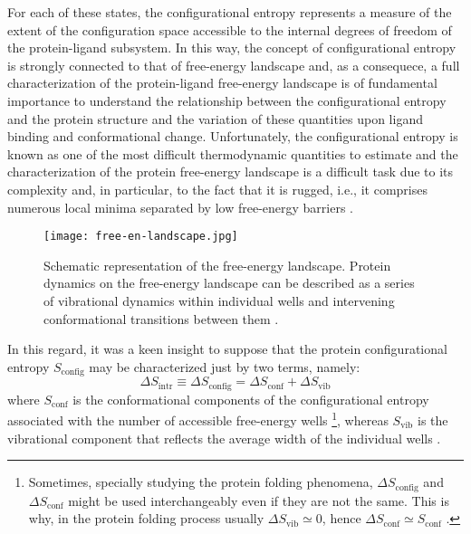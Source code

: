 For each of these states, the configurational entropy represents a measure of the extent of the configuration space accessible to the internal degrees of freedom of the protein-ligand subsystem. In this way, the concept of configurational entropy is strongly connected to that of free-energy landscape and, as a consequece, a full characterization of the protein-ligand free-energy landscape is of fundamental importance to understand the relationship between the configurational entropy and the protein structure and the variation of these quantities upon ligand binding and conformational change. Unfortunately, the configurational entropy is known as one of the most difficult thermodynamic quantities to estimate and the characterization of the protein free-energy landscape is a difficult task due to its complexity and, in particular, to the fact that it is rugged, i.e., it comprises numerous local minima separated by low free-energy barriers \cite{chong2015dissecting}. 

\begin{figure}[h]
\centering
\begin{minipage}[t]{0.8\textwidth}
\centering
\texttt{[image: free-en-landscape.jpg]}

\caption{\small{Schematic representation of the free-energy landscape. Protein dynamics on the free-energy landscape can be described as a series of vibrational dynamics within individual wells and intervening conformational transitions between them \cite{chong2015dissecting}.}}

\label{fig:generation-of-microcan_state}
\end{minipage} 
\end{figure}
In this regard, it was a keen insight to suppose that the protein configurational entropy $S_\text{config}$ may be characterized just by two terms, namely: 
\begin{equation*}
\label{entropy-variation:configurational}
\Delta S_\text{intr} \equiv \Delta S_\text{config} = \Delta S_\text{conf} + \Delta S_\text{vib}
\end{equation*}
where  $S_\text{conf}$ is the conformational components of the configurational entropy associated with the number of accessible free-energy wells \footnote{Sometimes, specially studying the protein folding phenomena, $\Delta S_\text{config}$ and  $\Delta S_\text{conf}$ might be used interchangeably even if they are not the same. This is why, in the protein folding process usually $\Delta S_\text{vib} \simeq 0$, hence $\Delta S_\text{conf} \simeq S_\text{conf}$ \cite{karplus1987configurational}.}, whereas $S_\text{vib}$ is the vibrational component that reflects the average width of the individual wells \cite{chong2015dissecting, karplus1987configurational}.%

